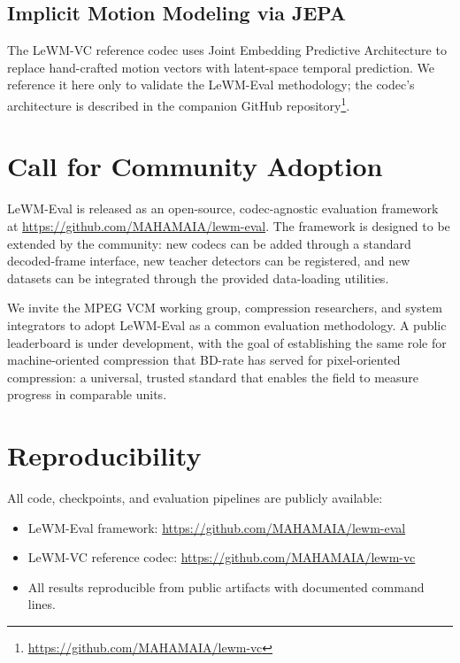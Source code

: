 \documentclass{article}
\begin{document}
\subsection{Implicit Motion Modeling via JEPA}
The LeWM-VC reference codec uses Joint Embedding Predictive Architecture to replace hand-crafted motion vectors with latent-space temporal prediction. We reference it here only to validate the LeWM-Eval methodology; the codec's architecture is described in the companion GitHub repository\footnote{\url{https://github.com/MAHAMAIA/lewm-vc}}.

\section{Call for Community Adoption}
\label{sec:adoption}

LeWM-Eval is released as an open-source, codec-agnostic evaluation framework at \url{https://github.com/MAHAMAIA/lewm-eval}. The framework is designed to be extended by the community: new codecs can be added through a standard decoded-frame interface, new teacher detectors can be registered, and new datasets can be integrated through the provided data-loading utilities.

We invite the MPEG VCM working group, compression researchers, and system integrators to adopt LeWM-Eval as a common evaluation methodology. A public leaderboard is under development, with the goal of establishing the same role for machine-oriented compression that BD-rate has served for pixel-oriented compression: a universal, trusted standard that enables the field to measure progress in comparable units.

\section*{Reproducibility}
All code, checkpoints, and evaluation pipelines are publicly available:
\begin{itemize}
\item LeWM-Eval framework: \url{https://github.com/MAHAMAIA/lewm-eval}
\item LeWM-VC reference codec: \url{https://github.com/MAHAMAIA/lewm-vc}
\item All results reproducible from public artifacts with documented command lines.
\end{itemize}
\end{document}
